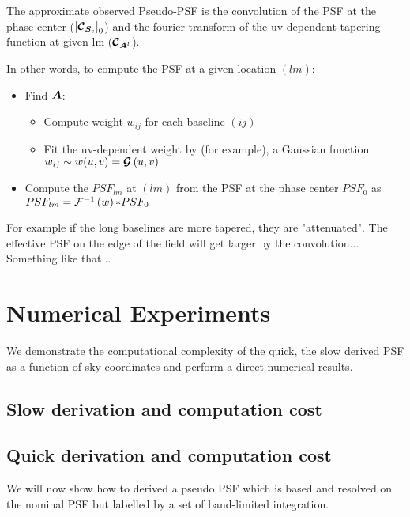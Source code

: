 The approximate observed Pseudo-PSF is the convolution of the PSF at
the phase center ($\left[\bm{\mathcal{C}}_{\bm{S}_{c}}\right]_0$) and the fourier transform of the uv-dependent tapering function at given
lm ($\bm{\mathcal{C}}_{\bm{A}^l}$).

In other words, to compute the PSF at a given location $(lm)$:

\begin{itemize}
  \item Find $\bm{A}$:
    \begin{itemize}
    \item Compute weight $w_{ij}$ for each baseline $(ij)$
    \item Fit the uv-dependent weight by (for example), a Gaussian function $w_{ij}\sim w(u,v)=\bm{\mathcal{G}}\left(u,v\right)$ 
    \end{itemize}
  \item Compute the $PSF_{lm}$ at $(lm)$ from the PSF at the phase center $PSF_0$ as $PSF_{lm}=\mathcal{F}^{-1}\left(w\right)\mathcal{*} PSF_0$
\end{itemize}
For example if the long baselines are more tapered, they are
"attenuated". The effective PSF on the edge of the field will get
larger by the convolution...
Something like that...
\section{Numerical Experiments}
We demonstrate the computational complexity of the quick, the slow derived PSF as a function of sky coordinates and 
perform a direct numerical results.
\subsection{Slow derivation and computation cost}
\subsection{Quick derivation and computation cost}
We will now show how to derived a pseudo PSF  which is based and resolved on the nominal PSF
but labelled by a set of band-limited integration.

